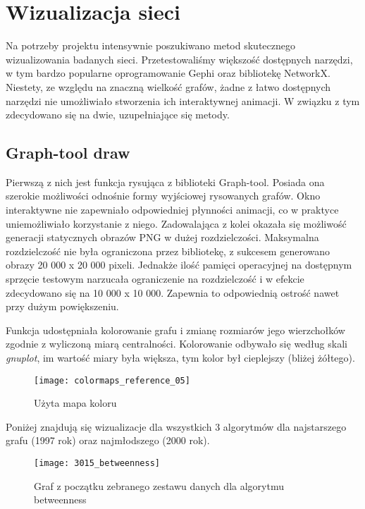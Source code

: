 \chapter{Wizualizacja sieci}

Na potrzeby projektu intensywnie poszukiwano metod skutecznego wizualizowania badanych sieci. Przetestowaliśmy większość dostępnych narzędzi, w tym bardzo popularne oprogramowanie Gephi oraz bibliotekę NetworkX. Niestety, ze względu na znaczną wielkość grafów, żadne z łatwo dostępnych narzędzi nie umożliwiało stworzenia ich interaktywnej animacji. W związku z tym zdecydowano się na dwie, uzupełniające się metody.

\section{Graph-tool draw}

Pierwszą z nich jest funkcja rysująca z biblioteki Graph-tool. Posiada ona szerokie możliwości odnośnie formy wyjściowej rysowanych grafów. Okno interaktywne nie zapewniało odpowiedniej płynności animacji, co w praktyce uniemożliwiało korzystanie z niego. Zadowalająca z kolei okazała się możliwość generacji statycznych obrazów PNG w dużej rozdzielczości. Maksymalna rozdzielczość nie była ograniczona przez bibliotekę, z sukcesem generowano obrazy 20 000 x 20 000 pixeli. Jednakże ilość pamięci operacyjnej na dostępnym sprzęcie testowym narzucała ograniczenie na rozdzielczość i w efekcie zdecydowano się na 10 000 x 10 000. Zapewnia to odpowiednią ostrość nawet przy dużym powiększeniu.
 
Funkcja udostępniała kolorowanie grafu i zmianę rozmiarów jego wierzchołków zgodnie z wyliczoną miarą centralności. Kolorowanie odbywało się według skali \textit{gnuplot}, im wartość miary była większa, tym kolor był cieplejszy (bliżej żółtego).

\FloatBarrier\FloatBarrier
\begin{figure}[h]
	\centering
	\texttt{[image: colormaps\_reference\_05]}
	\caption{Użyta mapa koloru}
\end{figure}
\FloatBarrier\FloatBarrier

Poniżej znajdują się wizualizacje dla wszystkich 3 algorytmów dla najstarszego grafu (1997 rok) oraz najmłodszego (2000 rok).

\FloatBarrier\FloatBarrier
\begin{figure}[h]
	\centering
	\texttt{[image: 3015\_betweenness]}
	\caption{Graf z początku zebranego zestawu danych dla algorytmu betweenness}
\end{figure}
\FloatBarrier\FloatBarrier

